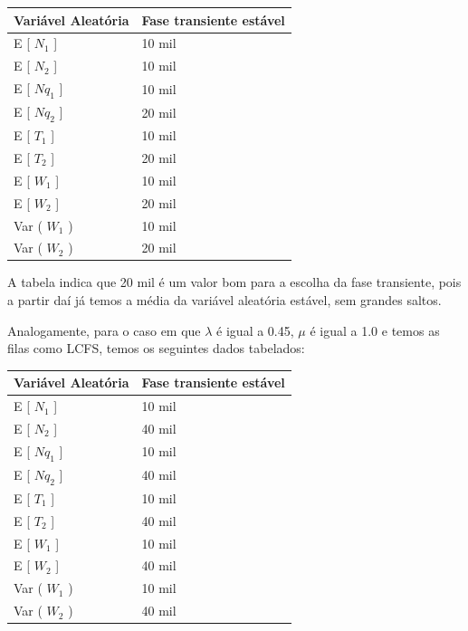 \documentclass[a4paper,10pt]{article}
\begin{document}
\begin{center}
\begin{tabular} { | l | l | }
    \hline
    Variável Aleatória  & Fase transiente estável \\ \hline
    E [ $N_1$ ]         & 10 mil \\ \hline
    E [ $N_2$ ]         & 10 mil \\ \hline
    E [ $Nq_1$ ]        & 10 mil \\ \hline
    E [ $Nq_2$ ]	    & 20 mil \\ \hline
    E [ $T_1$ ]         & 10 mil \\ \hline
    E [ $T_2$ ]         & 20 mil \\ \hline
    E [ $W_1$ ]         & 10 mil \\ \hline
    E [ $W_2$ ]         & 20 mil \\ \hline
    Var ( $W_1$ )       & 10 mil \\ \hline
    Var ( $W_2$ )       & 20 mil \\ \hline
\end{tabular}
\end{center}

    A tabela indica que 20 mil é um valor bom para a escolha da fase transiente, pois a partir daí já temos a média da variável aleatória estável, sem grandes saltos.

    Analogamente, para o caso em que $\lambda$ é igual a 0.45, $\mu$ é igual a 1.0 e temos as filas como LCFS, temos os seguintes dados tabelados:

\begin{center}
\begin{tabular} { | l | l | }
    \hline
    Variável Aleatória  & Fase transiente estável \\ \hline
    E [ $N_1$ ]         & 10 mil \\ \hline
    E [ $N_2$ ]         & 40 mil \\ \hline
    E [ $Nq_1$ ]        & 10 mil \\ \hline
    E [ $Nq_2$ ]	    & 40 mil \\ \hline
    E [ $T_1$ ]         & 10 mil \\ \hline
    E [ $T_2$ ]         & 40 mil \\ \hline
    E [ $W_1$ ]         & 10 mil \\ \hline
    E [ $W_2$ ]         & 40 mil \\ \hline
    Var ( $W_1$ )       & 10 mil \\ \hline
    Var ( $W_2$ )       & 40 mil \\ \hline
\end{tabular}
\end{center}
\end{document}
